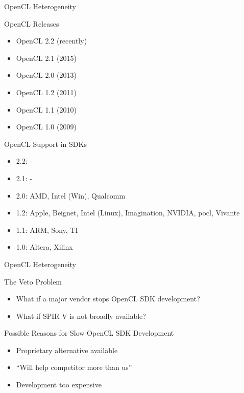 


\begin{frame}{OpenCL Heterogeneity}

 \begin{block}{OpenCL Releases}
   \begin{itemize}
    \item OpenCL 2.2 (recently)
    \item OpenCL 2.1 (2015)
    \item OpenCL 2.0 (2013)
    \item OpenCL 1.2 (2011)
    \item OpenCL 1.1 (2010)
    \item OpenCL 1.0 (2009)
   \end{itemize}
 \end{block}

 \begin{block}{OpenCL Support in SDKs}
   \begin{itemize}
    \item 2.2: -
    \item 2.1: -
    \item 2.0: AMD, Intel (Win), Qualcomm
    \item 1.2: Apple, Beignet, Intel (Linux), Imagination, NVIDIA, pocl, Vivante
    \item 1.1: ARM, Sony, TI
    \item 1.0: Altera, Xilinx
   \end{itemize}
 \end{block}
 
\end{frame}



\begin{frame}{OpenCL Heterogeneity}

 \begin{block}{The Veto Problem}
   \begin{itemize}
    \item What if a major vendor stops OpenCL SDK development?
    \item What if SPIR-V is not broadly available?
   \end{itemize}
 \end{block}

 \begin{block}{Possible Reasons for Slow OpenCL SDK Development}
   \begin{itemize}
    \item Proprietary alternative available
    \item ``Will help competitor more than us''
    \item Development too expensive
   \end{itemize}
 \end{block}
 
\end{frame}
% 


